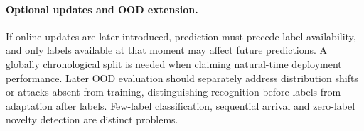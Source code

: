 \paragraph{Optional updates and OOD extension.} If online updates are later introduced, prediction must precede label availability, and only labels available at that moment may affect future predictions. A globally chronological split is needed when claiming natural-time deployment performance. Later OOD evaluation should separately address distribution shifts or attacks absent from training, distinguishing recognition before labels from adaptation after labels. Few-label classification, sequential arrival and zero-label novelty detection are distinct problems.
